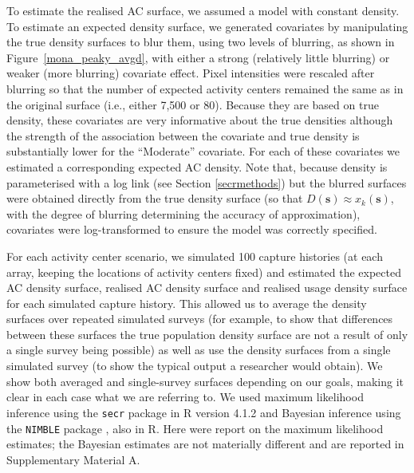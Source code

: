 \documentclass[useAMS,usenatbib,referee]{biom}
\begin{document}
To estimate the realised AC surface, we assumed a model with constant density. To estimate an expected density surface, we generated covariates by manipulating the true density surfaces to blur them, using two levels of blurring, as shown in Figure~\ref{mona_peaky_avgd}, with either a strong (relatively little blurring) or weaker (more blurring) covariate effect. Pixel intensities were rescaled after blurring so that the number of expected activity centers remained the same as in the original surface (i.e., either 7,500 or 80). Because they are based on true density, these covariates are very informative about the true densities although the strength of the association between the covariate and true density is substantially lower for the ``Moderate'' covariate. For each of these covariates we estimated a corresponding expected AC density. Note that, because density is parameterised with a log link (see Section \ref{secrmethods}) but the blurred surfaces were obtained directly from the true density surface (so that $D(\mathbf{s})\approx x_k(\mathbf{s})$, with the degree of blurring determining the accuracy of approximation), covariates were log-transformed to ensure the model was correctly specified.

For each activity center scenario, we simulated 100 capture histories (at each array, keeping the locations of activity centers fixed) and estimated the expected AC density surface, realised AC density surface and realised usage density surface for each simulated capture history. This allowed us to average the density surfaces over repeated simulated surveys (for example, to show that differences between these surfaces the true population density surface are not a result of only a single survey being possible) as well as use the density surfaces from a single simulated survey (to show the typical output a researcher would obtain). We show both averaged and single-survey surfaces depending on our goals, making it clear in each case what we are referring to. We used maximum likelihood inference using the \texttt{secr} package \citep{secr:21} in R version 4.1.2 and Bayesian inference using the \texttt{NIMBLE} package \citep{deValpine:17, Turek:21}, also in R. Here were report on the maximum likelihood estimates; the Bayesian estimates are not materially different and are reported in Supplementary Material A.

\end{document}
